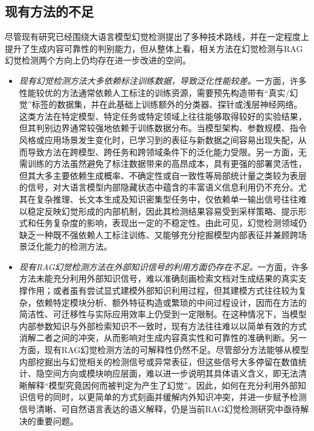 \subsection{现有方法的不足}\label{subsec:existing_methods_shortcomings}

尽管现有研究已经围绕大语言模型幻觉检测提出了多种技术路线，并在一定程度上提升了生成内容可靠性的判别能力，但从整体上看，相关方法在幻觉检测与RAG幻觉检测两个方向上仍均存在进一步改进的空间。


\begin{itemize}
    \item \emph{现有幻觉检测方法大多依赖标注训练数据，导致泛化性能较差。}一方面，许多性能较优的方法通常依赖人工标注的训练资源，需要预先构造带有“真实/幻觉”标签的数据集，并在此基础上训练额外的分类器、探针或浅层神经网络。这类方法在特定模型、特定任务或特定领域上往往能够取得较好的实验结果，但其判别边界通常较强地依赖于训练数据分布。当模型架构、参数规模、指令风格或应用场景发生变化时，已学习到的表征与新数据之间容易出现失配，从而导致方法在跨模型、跨任务和跨领域条件下的泛化能力受限。另一方面，无需训练的方法虽然避免了标注数据带来的高昂成本，具有更强的部署灵活性，但其大多主要依赖生成概率、不确定性或自一致性等局部统计量之类较为表层的信号，对大语言模型内部隐藏状态中蕴含的丰富语义信息利用仍不充分。尤其在复杂推理、长文本生成及知识密集型任务中，仅依赖单一输出信号往往难以稳定反映幻觉形成的内部机制，因此其检测结果容易受到采样策略、提示形式和任务复杂度的影响，表现出一定的不稳定性。由此可见，幻觉检测领域仍缺乏一种既不强依赖人工标注训练、又能够充分挖掘模型内部表征并兼顾跨场景泛化能力的检测方法。
    \item \emph{现有RAG幻觉检测方法在外部知识信号的利用方面仍存在不足。}一方面，许多方法未能充分利用外部知识信号，难以准确刻画检索文档对生成结果的真实支撑作用；或者虽有尝试显式建模外部知识利用过程，但其建模方式往往较为复杂，依赖特定模块分析、额外特征构造或繁琐的中间过程设计，因而在方法的简洁性、可迁移性与实际应用效率上仍受到一定限制。在这种情况下，当模型内部参数知识与外部检索知识不一致时，现有方法往往难以以简单有效的方式消解二者之间的冲突，从而影响对生成内容真实性和可靠性的准确判断。另一方面，现有RAG幻觉检测方法的可解释性仍然不足。尽管部分方法能够从模型内部挖掘出与幻觉相关的检测信号或异常表征，但这些信号大多停留在数值统计、隐空间方向或模块响应层面，难以进一步说明其具体语义含义，即无法清晰解释“模型究竟因何而被判定为产生了幻觉”。因此，如何在充分利用外部知识信号的同时，以更简单的方式刻画并缓解内外知识冲突，并进一步赋予检测信号清晰、可自然语言表达的语义解释，仍是当前RAG幻觉检测研究中亟待解决的重要问题。
\end{itemize}

